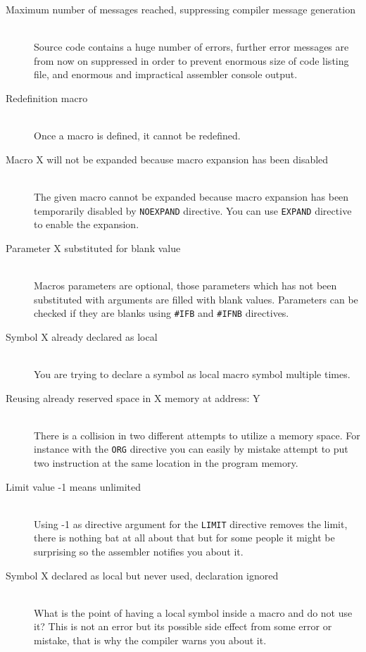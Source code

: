 \begin{description}
        \item[Maximum number of messages reached, suppressing compiler message generation]~\\
            Source code contains a huge number of errors, further error messages are from now on suppressed in order to prevent enormous size of code listing file, and enormous and impractical assembler console output.
        \item[Redefinition macro]~\\
            Once a macro is defined, it cannot be redefined.
        \item[Macro X will not be expanded because macro expansion has been disabled]~\\
            The given macro cannot be expanded because macro expansion has been temporarily disabled by \texttt{NOEXPAND} directive. You can use \texttt{EXPAND} directive to enable the expansion.
        \item[Parameter X substituted for blank value ]~\\
            Macros parameters are optional, those parameters which has not been substituted with arguments are filled with blank values. Parameters can be checked if they are blanks using \texttt{\#IFB} and \texttt{\#IFNB} directives.
        \item[Symbol X already declared as local]~\\
            You are trying to declare a symbol as local macro symbol multiple times.
        \item[Reusing already reserved space in X memory at address: Y]~\\
            There is a collision in two different attempts to utilize a memory space. For instance with the \texttt{ORG} directive you can easily by mistake attempt to put two instruction at the same location in the program memory.
        \item[Limit value -1 means unlimited]~\\
            Using -1 as directive argument for the \texttt{LIMIT} directive removes the limit, there is nothing bat at all about that but for some people it might be surprising so the assembler notifies you about it.
        \item[Symbol X declared as local but never used, declaration ignored]~\\
            What is the point of having a local symbol inside a macro and do not use it? This is not an error but its possible side effect from some error or mistake, that is why the compiler warns you about it.

\end{description}
